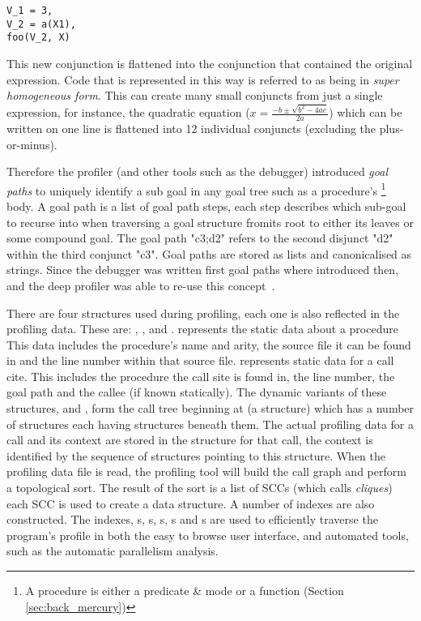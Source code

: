 \begin{verbatim}
V_1 = 3,
V_2 = a(X1),
foo(V_2, X)
\end{verbatim}

\noindent
This new conjunction is flattened into the conjunction that contained the
original expression.
Code that is represented in this way is referred to as being in \emph{super
homogeneous form}.
This can create many small conjuncts from just a single expression,
for instance, the quadratic equation
($x=\frac{-b \pm \sqrt {b^2-4ac}}{2a}$) which can be written on one line
is flattened into 12 individual conjuncts (excluding the plus-or-minus).

Therefore the profiler
(and other tools such as the debugger) introduced \emph{goal paths}
to uniquely identify a sub goal in any goal tree such as a procedure's%
\footnote{
A procedure is either a predicate \& mode or a function (Section
\ref{sec:back_mercury})}
body.
A goal path is a list of goal path steps, each step describes which
sub-goal to recurse into when traversing a goal structure fromits root
to either its leaves or some compound goal.
The goal path "c3;d2" refers to the second disjunct "d2" within the
third conjunct "c3".
Goal paths are stored as lists and canonicalised as strings.
Since the debugger was written first goal paths where introduced then,
and the deep profiler was able to re-use this concept~\citep{mdb}.

There are four structures used during profiling,
each one is also reflected in the profiling data.
These are: {\PS}, {\PD}, {\CSS} and {\CSD}.
{\PS} represents the static data about a procedure
This data includes the procedure's name and arity,
the source file it can be found in and the line number within that source file.
\CSS represents static data for a call cite.
This includes the procedure the call site is found in, the line number,
the goal path and the callee (if known statically).
The dynamic variants of these structures, \PD and {\CSD},
form the call tree beginning at  (a \PD structure)
which has a number of \CSD structures each having \PD structures
beneath them.
The actual profiling data for a call and its context are stored in
the \CSD structure for that call,
the context is identified by the sequence of structures pointing to this
structure.
When the profiling data file is read,
the profiling tool will build the call graph and perform a topological
sort.
The result of the sort is a list of SCCs
(which \citet{conway:2001:mercury-deep} calls \emph{cliques})
each SCC is used to create a \Clique data structure.
A number of indexes are also constructed.
The indexes, {\Clique}s, {\PS}s, {\PD}s, {\CSS}s and {\CSD}s are used to
efficiently traverse the program's profile in both
the easy to browse user interface,
and automated tools, such as the automatic parallelism analysis.

